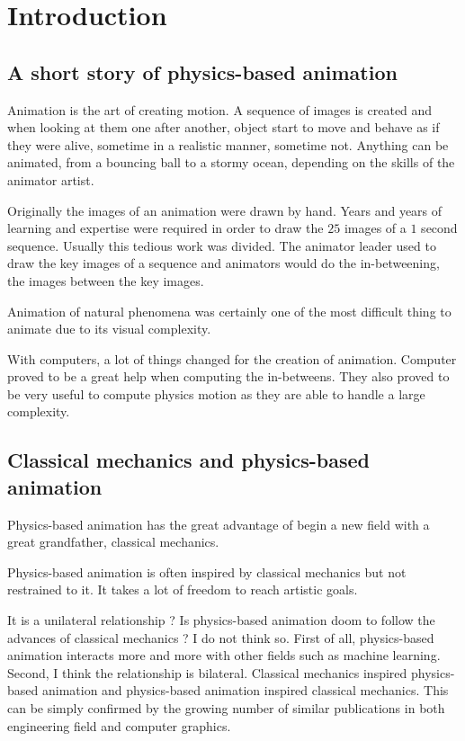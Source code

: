 \chapter{Introduction}
\label{chap:introdution}

\section{A short story of physics-based animation}
Animation is the art of creating motion. A sequence of images is created and when looking at them one after another, object start to move and behave as if they were alive, sometime in a realistic manner, sometime not. Anything can be animated, from a bouncing ball to a stormy ocean, depending on the skills of the animator artist.

Originally the images of an animation were drawn by hand. Years and years of learning and expertise were required in order to draw the $25$ images of a $1$ second sequence. Usually this tedious work was divided. The animator leader used to draw the key images of a sequence and animators would  do the in-betweening, the images between the key images.

Animation of natural phenomena was certainly one of the most difficult thing to animate due to its visual complexity.

With computers, a lot of things changed for the creation of animation. Computer proved to be a great help when computing the in-betweens. They also proved to be very useful to compute physics motion as they are able to handle a large complexity.

\section{Classical mechanics and physics-based animation}
Physics-based animation has the great advantage of begin a new field with a great grandfather, classical mechanics.

Physics-based animation is often inspired by classical mechanics but not restrained to it. It takes a lot of freedom to reach artistic goals.

It is a unilateral relationship ? Is physics-based animation doom to follow the advances of classical mechanics ? I do not think so. First of all, physics-based animation interacts more and more with other fields such as machine learning. Second, I think the relationship is bilateral. Classical mechanics inspired physics-based animation and physics-based animation inspired classical mechanics. This can be simply confirmed by the growing number of similar publications in both engineering field and computer graphics.

